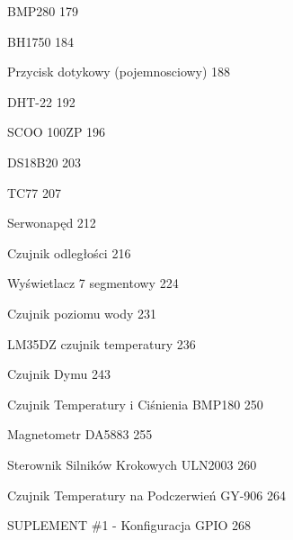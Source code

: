 \documentclass[11pt, a4paper]{article}
\begin{document}
BMP280 
\hfill
179

BH1750 
\hfill
184

Przycisk dotykowy (pojemnosciowy)
\hfill
188

DHT-22
\hfill
192

SCOO 100ZP
\hfill
196

DS18B20 
\hfill
203

TC77
\hfill
207

Serwonapęd
\hfill
212

\newpage

Czujnik odległości
\hfill
216

Wyświetlacz 7 segmentowy 
\hfill
224

Czujnik poziomu wody 
\hfill
231

LM35DZ czujnik temperatury
\hfill
236

Czujnik Dymu
\hfill
243

Czujnik Temperatury i Ciśnienia BMP180
\hfill
250

Magnetometr DA5883
\hfill
255

Sterownik Silników Krokowych ULN2003
\hfill
260

Czujnik Temperatury na Podczerwień GY-906
\hfill
264

SUPLEMENT \#1 - Konfiguracja GPIO
\hfill
268
\end{document}
